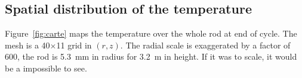 \subsection{Spatial distribution of the temperature}

Figure~\ref{fig:carte} maps the temperature over the whole rod at end of cycle.
The mesh is a \num{40}$\times$\num{11} grid in $(r,z)$. The radial scale is exaggerated
by a factor of \num{600}, the rod is \SI{5.3}{\milli\metre} in radius for
\SI{3.2}{\metre} in height. If it was to scale, it would be a impossible to see.
